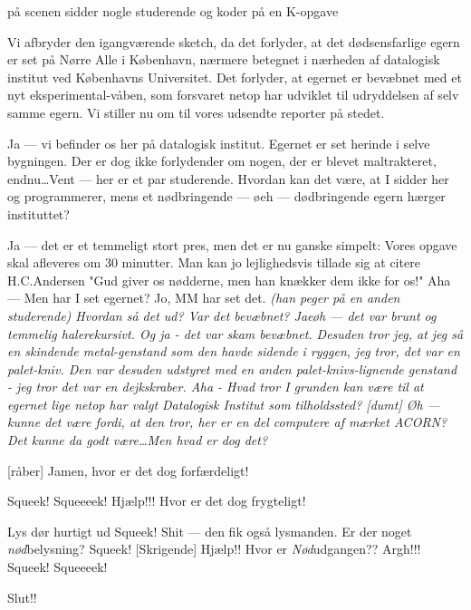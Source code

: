 \documentclass{article}
\begin{document}
\begin{sketch}

\scene på scenen sidder nogle studerende og koder på en K-opgave

 Vi afbryder den igangværende sketch, da det forlyder,
at det dødsensfarlige egern er set på Nørre Alle i København, nærmere
betegnet i nærheden af datalogisk institut ved Københavns Universitet. Det
forlyder, at egernet er bevæbnet med et nyt eksperimental-våben, som 
forsvaret netop har udviklet til udryddelsen af selv samme egern. Vi stiller
nu om til vores udsendte reporter på stedet.

 Ja --- vi befinder os her på datalogisk institut. Egernet er
set herinde i selve bygningen. Der er dog ikke forlydender om nogen, der
er blevet maltrakteret, endnu\ldots Vent --- her er et par studerende. Hvordan
kan det være, at I sidder her og programmerer, mens et nødbringende ---
øeh --- dødbringende egern hærger instituttet?

 Ja --- det er et temmeligt stort pres, men det er nu ganske 
simpelt: Vores opgave skal afleveres om 30 minutter. Man kan jo lejlighedsvis
tillade sig at citere H.C.Andersen "Gud giver os nødderne, men han knækker
dem ikke for os!"
 Aha --- Men har I set egernet?
 Jo, MM har set det. \em{(han peger på en anden studerende)}
 Hvordan så det ud? Var det bevæbnet?
 Jaeøh --- det var brunt og temmelig halerekursivt. Og ja - det
var skam bevæbnet. Desuden tror jeg, at jeg så en skindende metal-genstand som
den havde sidende i ryggen, jeg tror, det var en palet-kniv. Den var desuden 
udstyret med en anden palet-knivs-lignende genstand - jeg tror det var en
dejkskraber.
 Aha - Hvad tror I grunden kan være til at egernet lige netop har
valgt Datalogisk Institut som tilholdssted?
 [dumt] Øh --- kunne det være fordi, at den tror, her er en del
computere af mærket ACORN?
 Det kunne da godt være\ldots Men hvad er dog det?

 [råber] Jamen, hvor er det dog forfærdeligt!

 Squeek! Squeeeek!
 Hjælp!!! Hvor er det dog frygteligt!

\scene Lys dør hurtigt ud
 Squeek!
 Shit --- den fik også lysmanden. Er der noget {\em
 nød}belysning?
 Squeek!
 [Skrigende] Hjælp!! Hvor er {\em Nød}udgangen?? Argh!!!
 Squeek! Squeeeek!

\scene Slut!!

\end{sketch}
\end{document}
